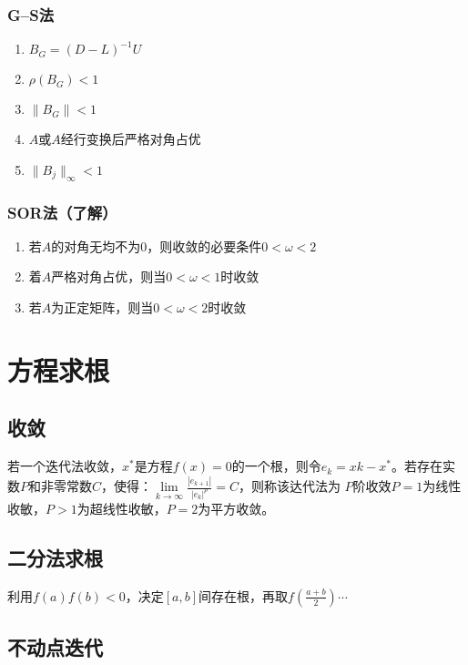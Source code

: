 \documentclass[UTF8,a4paper,11pt,oneside]{ctexbook}
\begin{document}
\subsection{G--S法}
\begin{enumerate}
    \item \(B_G=(D-L)^{-1}U\)
    \item \(\rho(B_G)<1\)
    \item \(\|B_G\|<1\)
    \item \(A\)或\(A\)经行变换后严格对角占优
    \item \(\|B_j\|_\infty<1\)
\end{enumerate}

\subsection{SOR法（了解）}
\begin{enumerate}
    \item 若\(A\)的对角无均不为0，则收敛的必要条件\(0<\omega<2\)
    \item 着\(A\)严格对角占优，则当\(0<\omega<1\)时收敛
    \item 若\(A\)为正定矩阵，则当\(0<\omega<2\)时收敛
\end{enumerate}

\chapter{方程求根}

\section{收敛}

若一个迭代法收敛，\(x^*\)是方程\(f(x)=0\)的一个根，则令\(e_k=xk-x^*\)。若存在实数\(P\)和非零常数\(C\)，使得：\(\lim\limits_{k\to\infty}\frac{|e_{k+1}|}{|e_k|^p}=C\)，则称该达代法为 \(P\)阶收效\(P=1\)为线性收敏，\(P>1\)为超线性收敏，\(P=2\)为平方收敛。

\section{二分法求根}

利用\(f(a)f(b)<0\)，决定\([a,b]\)间存在根，再取\(f\left(\frac{a+b}{2}\right)\cdots\)

\section{不动点迭代}
\end{document}
